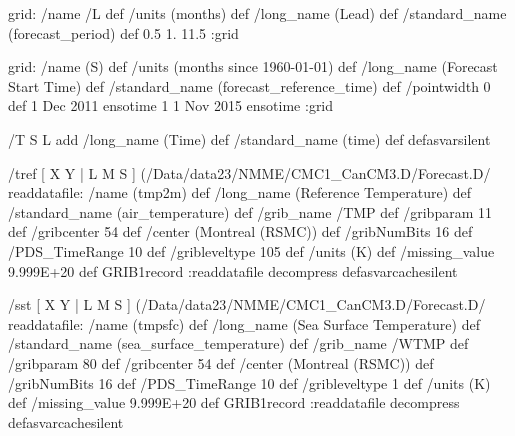 \begin{ingrid}
grid:
/name /L def
/units (months) def
/long_name (Lead) def
/standard_name (forecast_period) def
0.5 1. 11.5
:grid

grid:
/name (S) def
/units (months since 1960-01-01) def
/long_name (Forecast Start Time) def
/standard_name (forecast_reference_time) def
/pointwidth 0 def
1 Dec 2011 ensotime
1
1 Nov 2015 ensotime
:grid


%

/T { S L add
/long_name (Time) def
/standard_name (time) def } defasvarsilent

/tref {
[ X Y | L M S ] (/Data/data23/NMME/CMC1_CanCM3.D/Forecast.D/%
readdatafile: 
/name (tmp2m) def
/long_name (Reference Temperature) def
/standard_name (air_temperature) def
/grib_name /TMP def
/gribparam 11 def
/gribcenter 54 def
/center (Montreal (RSMC)) def
/gribNumBits 16 def
/PDS_TimeRange 10 def
/gribleveltype 105 def
/units (K) def
/missing_value 9.999E+20 def
GRIB1record
:readdatafile decompress
} defasvarcachesilent

/sst {
[ X Y | L M S ] (/Data/data23/NMME/CMC1_CanCM3.D/Forecast.D/%
readdatafile: 
/name (tmpsfc) def
/long_name (Sea Surface Temperature) def
/standard_name (sea_surface_temperature) def
/grib_name /WTMP def
/gribparam 80 def
/gribcenter 54 def
/center (Montreal (RSMC)) def
/gribNumBits 16 def
/PDS_TimeRange 10 def
/gribleveltype 1 def
/units (K) def
/missing_value 9.999E+20 def
GRIB1record
:readdatafile decompress
} defasvarcachesilent


\end{ingrid}
